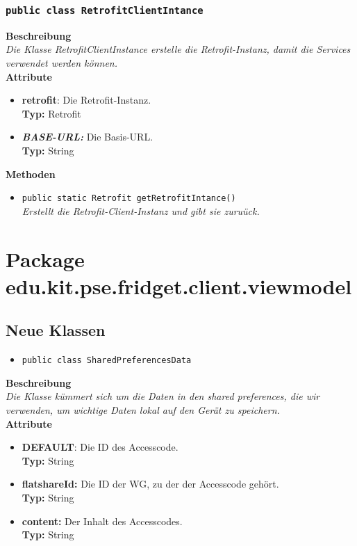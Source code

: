 \documentclass[a4paper]{scrreprt}
\begin{document}
	\subsubsection{\texttt{public class RetrofitClientIntance}}
	\textbf{Beschreibung} \\
	\textit{Die Klasse RetrofitClientInstance erstelle die Retrofit-Instanz, damit die Services verwendet werden können.} \\
	
	\textbf{Attribute}
	\begin{itemize}
		\item \textbf{retrofit}: Die Retrofit-Instanz. \\
		\textbf{Typ:} Retrofit
		
		\item \textbf\textit{{BASE-URL:}} Die Basis-URL. \\
		\textbf{Typ:} String
	\end{itemize}
	\textbf{Methoden}
	\begin{itemize}
		\item{\texttt{public static Retrofit getRetrofitIntance()}}\\
		\textit{Erstellt die Retrofit-Client-Instanz und gibt sie zuruück.}\\
	\end{itemize}

	\section{Package edu.kit.pse.fridget.client.viewmodel}
		\subsection{Neue Klassen}
		\begin{itemize}
			\item \texttt{public class SharedPreferencesData}
		\end{itemize}
	\textbf{Beschreibung} \\
	\textit{Die Klasse kümmert sich um die Daten in den shared preferences, die wir verwenden, um wichtige Daten lokal auf den Gerät zu speichern.} \\
	
	\textbf{Attribute}
	\begin{itemize}
		\item \textbf{DEFAULT}: Die ID des Accesscode. \\
		\textbf{Typ:} String
		
		\item \textbf{flatshareId:} Die ID der WG, zu der der Accesscode gehört. \\
		\textbf{Typ:} String
		
		\item \textbf{content:} Der Inhalt des Accesscodes.\\
		\textbf{Typ:} String
	\end{itemize}
	
\end{document}
